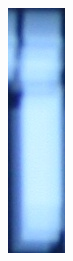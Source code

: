 \documentclass[a4paper]{article}
\begin{document}
\begin{enumerate}
\begin{enumerate}
\begin{figure}[H]
\begin{subfigure}[b]{.05\linewidth}
	            \includegraphics[width=\linewidth]{HW1-release/data/character_classification/new_images/2_I.jpg}

\end{subfigure}
\end{figure}
\end{enumerate}
\end{enumerate}
\end{document}
